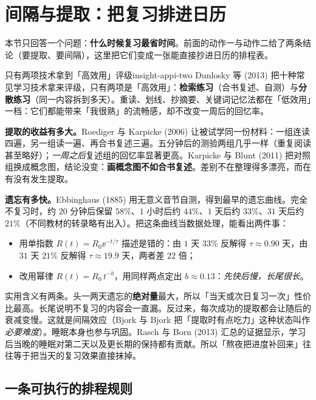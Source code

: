 \section{间隔与提取：把复习排进日历}

本节只回答一个问题：\textbf{什么时候复习最省时间}。前面的动作一与动作二给了两条结论（要提取、要间隔），这里把它们变成一张能直接抄进日历的排程表。

\begin{insight}{只有两项技术拿到「高效用」评级}{insight-appi-two}
Dunlosky 等 (2013) 把十种常见学习技术拿来评级，只有两项是「高效用」：\textbf{检索练习}（合书复述、自测）与\textbf{分散练习}（同一内容拆到多天）。重读、划线、抄摘要、关键词记忆法都在「低效用」一档：它们都能带来「我很熟」的流畅感，却不改变一周后的回忆率。
\end{insight}

\textbf{提取的收益有多大。}Roediger 与 Karpicke (2006) 让被试学同一份材料：一组连读四遍，另一组读一遍、再合书复述三遍。五分钟后的测验两组几乎一样（重复阅读甚至略好）；\emph{一周之后}复述组的回忆率显著更高。Karpicke 与 Blunt (2011) 把对照组换成概念图，结论没变：\textbf{画概念图不如合书复述}。差别不在整理得多漂亮，而在有没有发生提取。

\textbf{遗忘有多快。}Ebbinghaus (1885) 用无意义音节自测，得到最早的遗忘曲线。完全不复习时，约 $20$ 分钟后保留 $58\%$、$1$ 小时后约 $44\%$、$1$ 天后约 $33\%$、$31$ 天后约 $21\%$（不同教材的转录略有出入）。把这条曲线当数据处理，能看出两件事：

\begin{itemize}[nosep,leftmargin=1.6em]
\item 用单指数 $R(t)=R_0\ee^{-t/\tau}$ 描述是错的：由 $1$ 天 $33\%$ 反解得 $\tau\approx0.90$ 天，由 $31$ 天 $21\%$ 反解得 $\tau\approx19.9$ 天，两者差 $22$ 倍；
\item 改用幂律 $R(t)=R_0\,t^{-b}$，用同样两点定出 $b\approx0.13$：\emph{先快后慢，长尾很长}。
\end{itemize}

实用含义有两条。头一两天遗忘的\textbf{绝对量}最大，所以「当天或次日复习一次」性价比最高。长尾说明不复习的内容会一直漏。反过来，每次成功的提取都会让随后的衰减变慢。这就是间隔效应（Bjork 与 Bjork 把「提取时有点吃力」这种状态叫作\emph{必要难度}）。睡眠本身也参与巩固。Rasch 与 Born (2013) 汇总的证据显示，学习后当晚的睡眠对第二天以及更长期的保持都有贡献。所以「熬夜把进度补回来」往往等于把当天的复习效果直接抹掉。

\subsection{一条可执行的排程规则}


